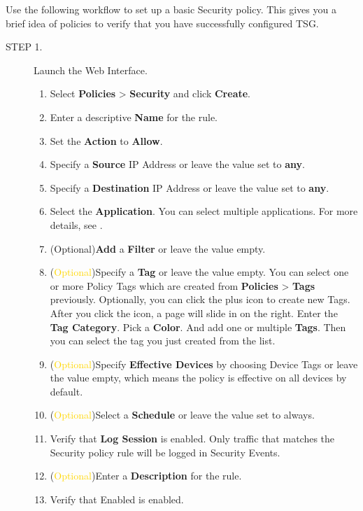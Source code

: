 Use the following workflow to set up a basic Security policy. This gives you a brief idea of policies to verify that you have successfully configured TSG.

\begin{description}
    \item[STEP 1.] Launch the Web Interface.
    \begin{enumerate} 
        \item Select \textbf{Policies} > \textbf{Security} and click \textbf{Create}.
        \item Enter a descriptive \textbf{Name} for the rule.
        \item Set the \textbf{Action} to \textbf{Allow}.
        \item Specify a \textbf{Source} IP Address or leave the value set to \textbf{any}.
        \item Specify a \textbf{Destination} IP Address or leave the value set to \textbf{any}.
        \item Select the \textbf{Application}. You can select multiple applications. For more details, see \hyperlink{link:Applications}{\color{linkblue}{Applications}}.
        \item (\textcolor[RGB]{205,153,16}{Optional})\textbf{Add} a \textbf{Filter} or leave the value empty.
        \item (\textcolor{gold}{Optional})Specify a \textbf{Tag} or leave the value empty.
        You can select one or more Policy Tags which are created from \textbf{Policies} > \textbf{Tags} previously. Optionally, you can click the plus icon to create new Tags.
         After you click the icon, a page will slide in on the right. Enter the \textbf{Tag Category}. Pick a \textbf{Color}. And add one or multiple \textbf{Tags}. 
         Then you can select the tag you just created from the list.
        \item (\textcolor{gold}{Optional})Specify \textbf{Effective Devices} by choosing Device Tags or leave the value empty, which means the policy is effective on all devices by default.
        \item (\textcolor{gold}{Optional})Select a \textbf{Schedule} or leave the value set to always.
        \item Verify that \textbf{Log Session} is enabled. Only traffic that matches the Security policy rule will be logged in Security Events.
        \item (\textcolor{gold}{Optional})Enter a \textbf{Description} for the rule.
        \item Verify that Enabled is enabled.

\end{enumerate}
\end{description}
